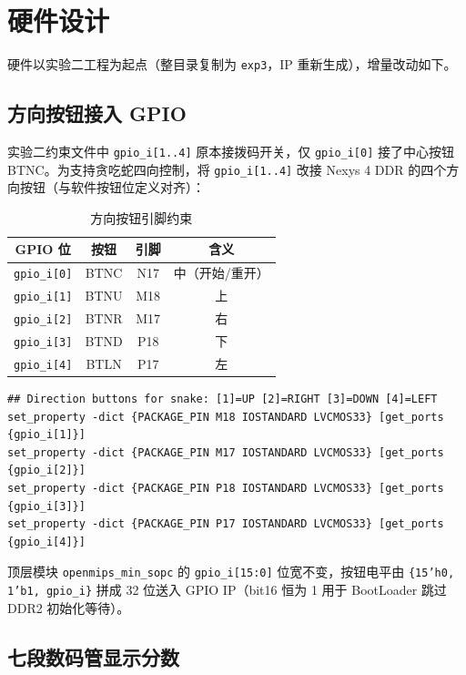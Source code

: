 \section{硬件设计}

硬件以实验二工程为起点（整目录复制为 \texttt{exp3}，IP 重新生成），增量改动如下。

\subsection{方向按钮接入 GPIO}

实验二约束文件中 \texttt{gpio\_i[1..4]} 原本接拨码开关，仅 \texttt{gpio\_i[0]} 接了中心按钮 BTNC。为支持贪吃蛇四向控制，将 \texttt{gpio\_i[1..4]} 改接 Nexys 4 DDR 的四个方向按钮（与软件按钮位定义对齐）：

\begin{table}[H]
    \centering
    \begin{tabular}{cccc}
        \toprule
        \textbf{GPIO 位} & \textbf{按钮} & \textbf{引脚} & \textbf{含义} \\
        \midrule
        \texttt{gpio\_i[0]} & BTNC & N17 & 中（开始/重开） \\
        \texttt{gpio\_i[1]} & BTNU & M18 & 上 \\
        \texttt{gpio\_i[2]} & BTNR & M17 & 右 \\
        \texttt{gpio\_i[3]} & BTND & P18 & 下 \\
        \texttt{gpio\_i[4]} & BTLN & P17 & 左 \\
        \bottomrule
    \end{tabular}
    \caption{方向按钮引脚约束}
\end{table}

\begin{lstlisting}[style=verilog, caption={xdc 中方向按钮约束}]
## Direction buttons for snake: [1]=UP [2]=RIGHT [3]=DOWN [4]=LEFT
set_property -dict {PACKAGE_PIN M18 IOSTANDARD LVCMOS33} [get_ports {gpio_i[1]}]
set_property -dict {PACKAGE_PIN M17 IOSTANDARD LVCMOS33} [get_ports {gpio_i[2]}]
set_property -dict {PACKAGE_PIN P18 IOSTANDARD LVCMOS33} [get_ports {gpio_i[3]}]
set_property -dict {PACKAGE_PIN P17 IOSTANDARD LVCMOS33} [get_ports {gpio_i[4]}]
\end{lstlisting}

顶层模块 \texttt{openmips\_min\_sopc} 的 \texttt{gpio\_i[15:0]} 位宽不变，按钮电平由 \texttt{\{15'h0, 1'b1, gpio\_i\}} 拼成 32 位送入 GPIO IP（bit16 恒为 1 用于 BootLoader 跳过 DDR2 初始化等待）。

\subsection{七段数码管显示分数}

